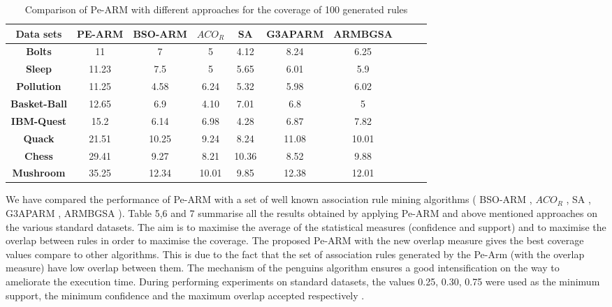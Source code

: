 \documentclass[preprint,12pt]{elsarticle}
\begin{document}
\begin{table}[htbp]
\small
\centering
\caption{Comparison of Pe-ARM with different approaches for the coverage of 100 generated rules}
\begin{tabular}{c c c c c c c c c c}
\toprule
\textbf{Data sets} & PE-ARM& BSO-ARM & $ACO_{R}$ & SA & G3APARM & ARMBGSA \\
\midrule
\textbf{Bolts}&11&	7	& 5& 4.12 & 8.24 & 6.25 &\\\hline
\textbf{Sleep}&11.23& 7.5	& 5 & 5.65 & 6.01 & 5.9 &\\\hline
\textbf{Pollution}&11.25&	4.58 & 6.24 & 5.32 & 5.98 & 6.02 &\\\hline
\textbf{Basket-Ball}&12.65&	6.9 & 4.10 & 7.01 & 6.8 & 5 &\\\hline
\textbf{IBM-Quest}&15.2& 6.14	& 6.98 & 4.28 & 6.87 & 7.82 &\\\hline
\textbf{Quack}&21.51&	10.25	& 9.24 & 8.24 & 11.08 & 10.01 &\\\hline
\textbf{Chess}&29.41&	9.27	& 8.21 & 10.36 & 8.52 & 9.88 &\\\hline
\textbf{Mushroom}&35.25& 12.34	& 10.01 & 9.85 & 12.38 & 12.01 &\\\hline
\bottomrule
\end{tabular}
\end{table}
\newpage
We have compared the performance of Pe-ARM with a set of well known association rule mining algorithms ( BSO-ARM \cite{22} , $ACO_{R}$ \cite{13}, 
SA \cite{30}, G3APARM  \cite{11},  ARMBGSA \cite{21}).
Table 5,6 and 7 summarise all the results obtained by applying Pe-ARM and above mentioned approaches on the various standard datasets. 
The aim is to maximise the average of the statistical measures (confidence and support) and to maximise the overlap 
between rules in order to maximise the coverage.
The proposed Pe-ARM with the new overlap measure gives the best coverage values compare to other  algorithms. This is due to the fact that the set of association rules generated by the Pe-Arm (with the overlap measure) have low overlap between them. 
The mechanism of the penguins algorithm ensures a good intensification  on the way to ameliorate the execution time.
During performing experiments on standard datasets, the values 0.25, 0.30, 0.75 were used as the minimum support, the minimum confidence and the maximum overlap accepted respectively . 
\end{document}
